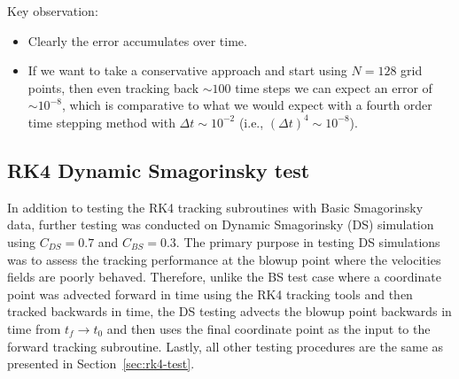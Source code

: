 Key observation:
\begin{itemize}
    \item Clearly the error accumulates over time. 
    \item If we want to take a conservative approach and start using 
            $N=128$ grid points, then even tracking back $\sim100$ time
            steps we can expect an error of $\sim 10^{-8}$, which is
            comparative to what we would expect with a fourth order time
            stepping method with $\Delta t \sim 10^{-2}$ 
            (i.e., $(\Delta t)^{4} \sim 10^{-8}$).
\end{itemize}

\subsection{RK4 Dynamic Smagorinsky test}\label{sec:rk4-ds-test}
In addition to testing the RK4 tracking subroutines with Basic Smagorinsky
data, further testing was conducted on Dynamic Smagorinsky (DS) simulation
using $C_{DS}=0.7$ and $C_{BS}=0.3$. The primary purpose in testing DS
simulations was to assess the tracking performance at the blowup point
where the velocities fields are poorly behaved. Therefore, unlike the BS
test case where a coordinate point was advected forward in time using the
RK4 tracking tools and then tracked backwards in time, the DS testing
advects the blowup point backwards in time from $t_{f}\rightarrow t_{0}$
and then uses the final coordinate point as the input to the forward
tracking subroutine. Lastly, all other testing procedures are the same as
presented in Section~\ref{sec:rk4-test}.


